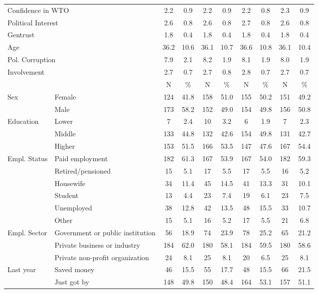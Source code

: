 \begin{table}[!htbp]
{\begin{tabular}[t]{llcccccccc}
\multicolumn{2}{l}{Confidence in WTO }  & 2.2 & 0.9 & 2.2 & 0.9 & 2.2 & 0.8 & 2.3 & 0.9\\
\multicolumn{2}{l}{Political Interest }  & 2.6 & 0.8 & 2.6 & 0.8 & 2.7 & 0.8 & 2.6 & 0.8\\
\multicolumn{2}{l}{Gentrust }  & 1.8 & 0.4 & 1.8 & 0.4 & 1.8 & 0.4 & 1.8 & 0.4\\
\multicolumn{2}{l}{Age }  & 36.2 & 10.6 & 36.1 & 10.7 & 36.6 & 10.8 & 36.1 & 10.4\\
\multicolumn{2}{l}{Pol. Corruption }  & 7.9 & 2.1 & 8.2 & 1.9 & 8.1 & 1.9 & 8.0 & 1.9\\
\multicolumn{2}{l}{Involvement }  & 2.7 & 0.7 & 2.7 & 0.8 & 2.8 & 0.7 & 2.7 & 0.7\\
\midrule
 &  & N & \% & N & \% & N & \% & N & \%\\
\midrule
Sex & Female & 124 & 41.8 & 158 & 51.0 & 155 & 50.2 & 151 & 49.2\\
 & Male & 173 & 58.2 & 152 & 49.0 & 154 & 49.8 & 156 & 50.8\\
Education & Lower & 7 & 2.4 & 10 & 3.2 & 6 & 1.9 & 7 & 2.3\\
 & Middle & 133 & 44.8 & 132 & 42.6 & 154 & 49.8 & 131 & 42.7\\
 & Higher & 153 & 51.5 & 166 & 53.5 & 147 & 47.6 & 167 & 54.4\\
Empl. Status & Paid employment & 182 & 61.3 & 167 & 53.9 & 167 & 54.0 & 182 & 59.3\\
 & Retired/pensioned & 15 & 5.1 & 17 & 5.5 & 17 & 5.5 & 16 & 5.2\\
 & Housewife & 34 & 11.4 & 45 & 14.5 & 41 & 13.3 & 31 & 10.1\\
 & Student & 13 & 4.4 & 23 & 7.4 & 19 & 6.1 & 23 & 7.5\\
 & Unemployed & 38 & 12.8 & 42 & 13.5 & 48 & 15.5 & 33 & 10.7\\
 & Other & 15 & 5.1 & 16 & 5.2 & 17 & 5.5 & 21 & 6.8\\
Empl. Sector & Government or public institution & 56 & 18.9 & 74 & 23.9 & 78 & 25.2 & 65 & 21.2\\
 & Private business or industry & 184 & 62.0 & 180 & 58.1 & 184 & 59.5 & 180 & 58.6\\
 & Private non-profit organization & 24 & 8.1 & 25 & 8.1 & 20 & 6.5 & 25 & 8.1\\
Last year & Saved money & 46 & 15.5 & 55 & 17.7 & 48 & 15.5 & 66 & 21.5\\
 & Just got by & 148 & 49.8 & 150 & 48.4 & 164 & 53.1 & 157 & 51.1\\

\end{tabular}}
\end{table}
